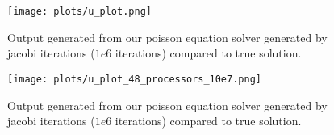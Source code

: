 \documentclass[a4paper]{exam}
\begin{document}
\begin{questions}
\begin{figure}
  \center
  \texttt{[image: plots/u\_plot.png]}
  \caption{Output generated from our poisson equation solver generated by jacobi iterations ($1e6$ iterations) compared to true solution.}
  \label{plot}
\end{figure}

\begin{figure}
  \center
  \texttt{[image: plots/u\_plot\_48\_processors\_10e7.png]}
  \caption{Output generated from our poisson equation solver generated by jacobi iterations ($1e6$ iterations) compared to true solution.}
  \label{plot1e7}
\end{figure}

\end{questions}
\end{document}
